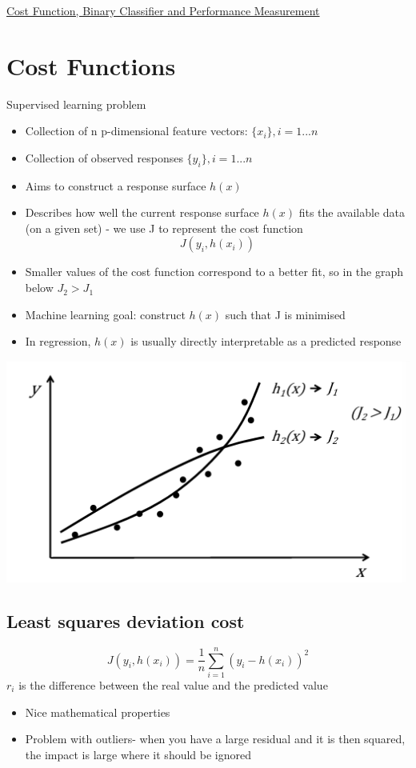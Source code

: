 \documentclass{article}[18pt]
\begin{document}
\begin{center}
\underline{\Large Cost Function, Binary Classifier and Performance Measurement}
\end{center}
\section{Cost Functions}
Supervised learning problem
\begin{itemize}
	\item Collection of n p-dimensional feature vectors: \hfill $\{x_i\}, i=1...n$
	\item Collection of observed responses \hfill $\{y_i\},i=1...n$
	\item Aims to construct a response surface \hfill $h(x)$
\end{itemize}
\begin{itemize}
	\item Describes how well the current response surface $h(x)$ fits the available data (on a given set) - we use J to represent the cost function
	$$J(y_i,h(x_i))$$
	\item Smaller values of the cost function correspond to a better fit, so in the graph below $J_2>J_1$
	\item Machine learning goal: construct $h(x)$ such that J is minimised
	\item In regression, $h(x)$ is usually directly interpretable as a predicted response
\end{itemize}
\begin{center}
	\includegraphics[scale=0.7]{"Cost Function"}
\end{center}
\subsection{Least squares deviation cost}
$$J(y_i,h(x_i))=\dfrac{1}{n}\sum_{i=1}^{n}{(y_i-h(x_i))^2}$$
$r_i$ is the difference between the real value and the predicted value 
\begin{itemize}
	\item Nice mathematical properties
	\item Problem with outliers- when you have a large residual and it is then squared, the impact is large where it should be ignored
\end{itemize}
\end{document}
